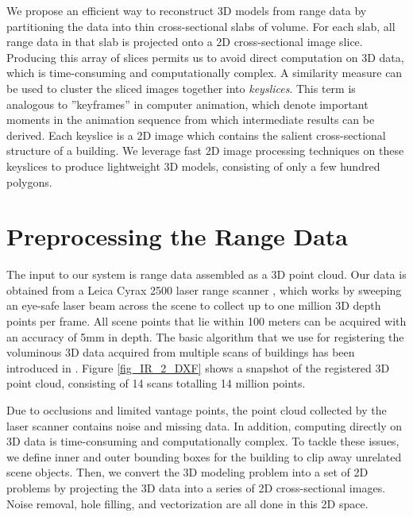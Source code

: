 \documentclass{llncs}
\begin{document}
We propose an efficient way to reconstruct 3D models from range data by
partitioning the data into thin cross-sectional slabs of volume.
For each slab, all range data in that slab is projected onto a 2D
cross-sectional image slice.
Producing this array of slices permits us to avoid direct computation on
3D data, which is time-consuming and computationally complex.
A similarity measure \cite{IR_Brown} can be used to cluster the sliced images
together into {\it keyslices}.
This term is analogous to ''keyframes'' in computer animation, which denote
important moments in the animation sequence from which intermediate results
can be derived.
Each keyslice is a 2D image which contains the salient cross-sectional
structure of a building.
We leverage fast 2D image processing techniques on these keyslices
to produce lightweight 3D models, consisting of only a few hundred polygons.

\section{Preprocessing the Range Data}
\label{sec_prep}
The input to our system is range data assembled as a 3D point cloud.
Our data is obtained from a Leica Cyrax 2500 laser range scanner \cite{RDP_LRS},
which works by sweeping an eye-safe laser beam across the scene to collect
up to one million 3D depth points per frame.
All scene points that lie within 100 meters can be acquired with an accuracy
of 5mm in depth.
The basic algorithm that we use for registering the voluminous 3D data
acquired from multiple scans of buildings has been introduced in
\cite{RDP_LS}.
Figure \ref{fig_IR_2_DXF} shows a snapshot of the
registered 3D point cloud, consisting of 14 scans totalling 14 million points.

Due to occlusions and limited vantage points, the point cloud collected by the
laser scanner \cite{RDP_LRS} contains noise and missing data.
In addition, computing directly on 3D data is time-consuming and
computationally complex.
To tackle these issues, we define inner and outer bounding boxes for the
building to clip away unrelated scene objects.
Then, we convert the 3D modeling problem into a set of 2D problems by
projecting the 3D data into a series of 2D cross-sectional images.
Noise removal, hole filling, and vectorization are all done in this
2D space.
\end{document}
